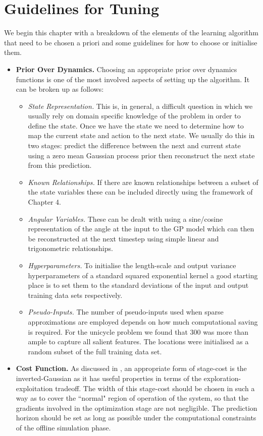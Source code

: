 \section{Guidelines for Tuning}
We begin this chapter with a breakdown of the elements of the learning algorithm that need to be chosen a priori and some guidelines for how to choose or initialise them.
\begin{itemize}
\item
{\bf Prior Over Dynamics.} Choosing an appropriate prior over dynamics functions is one of the most involved aspects of setting up the algorithm. It can be broken up as follows:
\begin{itemize}
\item
\textit{State Representation.} This is, in general, a difficult question in which we usually rely on domain specific knowledge of the problem in order to define the state. Once we have the state we need to determine how to map the current state and action to the next state. We usually do this in two stages: predict the difference between the next and current state using a zero mean Gaussian process prior then reconstruct the next state from this prediction.
\item
\textit{Known Relationships.} If there are known relationships between a subset of the state variables these can be included directly using the framework of Chapter 4.
\item
\textit{Angular Variables.} These can be dealt with using  a sine/cosine representation of the angle at the input to the GP model which can then be reconstructed at the next timestep using simple linear and trigonometric relationships.
\item
\textit{Hyperparameters.}  To initialise the length-scale and output variance hyperparameters of a standard squared exponential kernel a good starting place is to set them to the standard deviations of the input and output training data sets respectively.
\item
\textit{Pseudo-Inputs.} The number of pseudo-inputs used when sparse approximations are employed depends on how much computational saving is required. For the unicycle problem we found that 300 was more than ample to capture all salient features. The locations were initialised as a random subset of the full training data set.
\end{itemize}
\item
{\bf Cost Function.} As discussed in , an appropriate form of stage-cost is the inverted-Gaussian as it has useful properties in terms of the exploration-exploitation tradeoff. The width of this stage-cost should be chosen in such a way as to cover the ``normal" region of operation of the system, so that the gradients involved in the optimization stage are not negligible. The prediction horizon should be set as long as possible under the computational constraints of the offline simulation phase.

\end{itemize}
